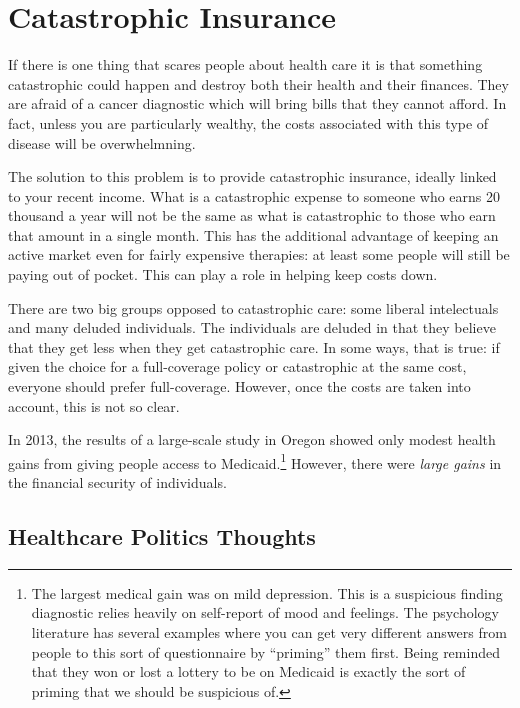 \section{Catastrophic Insurance}

If there is one thing that scares people about health care it is that something
catastrophic could happen and destroy both their health and their finances.
They are afraid of a cancer diagnostic which will bring bills that they cannot
afford. In fact, unless you are particularly wealthy, the costs associated with
this type of disease will be overwhelmning.

The solution to this problem is to provide catastrophic insurance, ideally
linked to your recent income. What is a catastrophic expense to someone who
earns 20 thousand a year will not be the same as what is catastrophic to those
who earn that amount in a single month. This has the additional advantage of
keeping an active market even for fairly expensive therapies: at least some
people will still be paying out of pocket. This can play a role in helping keep
costs down.

There are two big groups opposed to catastrophic care: some liberal
intelectuals and many deluded individuals. The individuals are deluded in that
they believe that they get less when they get catastrophic care. In some ways,
that is true: if given the choice for a full-coverage policy or catastrophic at
the same cost, everyone should prefer full-coverage. However, once the costs
are taken into account, this is not so clear.

In 2013, the results of a large-scale study in Oregon showed only modest health
gains from giving people access to Medicaid.\footnote{The largest medical gain
was on mild depression. This is a suspicious finding diagnostic relies heavily
on self-report of mood and feelings. The psychology literature has several
examples where you can get very different answers from people to this sort of
questionnaire by ``priming'' them first. Being reminded that they won or lost a
lottery to be on Medicaid is exactly the sort of priming that we should be
suspicious of.} However, there were \emph{large gains} in the financial
security of individuals.

\subsection{Healthcare Politics Thoughts}

